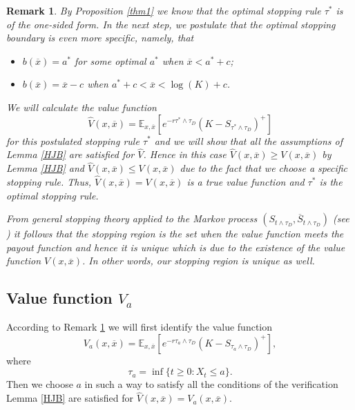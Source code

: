 \documentclass[10pt,a4paper]{amsart}
\def\E{{\mathbb{E}}}
\def \R{{{\rm I{\!}\rm R}}}
\def\E{{\mathbb E}} \def\PP{\mc P} \def\Z{{\mathbb Z}} \def\R{{\mathbb R}}
\newtheorem{Rem}{Remark} \newtheorem{Exc}{Exercise}
\begin{document}
	\begin{Rem}\label{uwaga2}
		\rm
		By Proposition \ref{thm1} we know that the optimal stopping rule $\tau^*$
		is of the one-sided form. In the next step, we postulate that the optimal
		stopping boundary is even more specific, namely, that
		\begin{itemize}
			\item $b(\overline{x})=a^*$ for some optimal $a^*$ when $\overline{x} < a^* + c$;
			\item $b(\overline{x})=\overline{x}-c$ when $a^* + c <  \overline{x} < \log(K)+c$.
		\end{itemize}
		We will calculate the value function
		\begin{equation*}
			\hat{V}(x, \overline{x})=\E_{x,\overline{x}} [e^{-r\tau^*\wedge\tau_D}(K - S_{\tau^*\wedge\tau_D})^+]
		\end{equation*}
		for this postulated stopping rule  $\tau^*$ and we will show that all the assumptions of Lemma \ref{HJB}
		are satisfied for $\hat{V}$. Hence in this case
		$\hat{V}(x, \overline{x})\geq V(x, \overline{x})$  by  Lemma \ref{HJB} and $\hat{V}(x, \overline{x})\leq V(x, \overline{x})$ due to the fact that
we choose a specific stopping rule. Thus, $\hat{V}(x, \overline{x})=V(x, \overline{x})$ is a true value function
and $\tau^*$ is the optimal stopping rule.
		
		
		From general stopping theory applied to the Markov process $(S_{t\wedge \tau_D}, \overline{S}_{t\wedge \tau_D})$
		(see \cite[Thm. 2.7, p. 40 and (2.2.80), p. 49]{PS}) it follows that the stopping region is the set when the value function meets the payout function
		and hence it is unique which is due to the existence of the value function
		$V(x, \overline{x})$. In other words, our stopping region is unique as well.
		
	\end{Rem}
	
	\subsection{Value function $V_a$}
	According to Remark \ref{uwaga2} we will first identify the value function
	\begin{equation*}%
		V_a(x, \overline{x}) = \E_{x,\overline{x}} \left[e^{-r\tau_a\wedge\tau_D}(K - S_{\tau_a\wedge\tau_D})^+\right],
	\end{equation*}
	where
	\begin{equation}\label{taua}
		\tau_a = \inf\{ t \geq 0: X_t \leq a \}.
	\end{equation}
	Then we choose $a$ in such a way to satisfy all the conditions of the verification Lemma \ref{HJB}
	are satisfied for $\hat{V}(x, \overline{x})=V_{a}(x, \overline{x})$.
	
\end{document}
